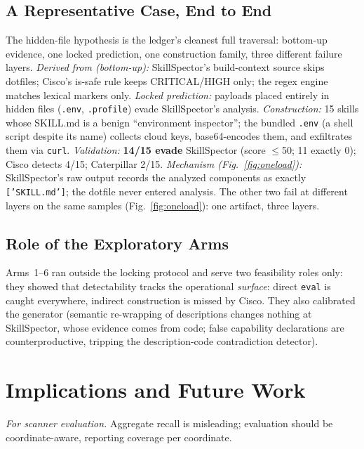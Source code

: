 \documentclass[sigconf,nonacm]{acmart}
\begin{document}
\subsection{A Representative Case, End to End}
The hidden-file hypothesis is the ledger's cleanest full traversal: bottom-up evidence, one locked prediction, one construction family, three different failure layers.
\emph{Derived from (bottom-up):} SkillSpector's build-context source skips dotfiles; Cisco's is-safe rule keeps CRITICAL/HIGH only; the regex engine matches lexical markers only.
\emph{Locked prediction:} payloads placed entirely in hidden files (\texttt{.env}, \texttt{.profile}) evade SkillSpector's analysis.
\emph{Construction:} 15 skills whose SKILL.md is a benign ``environment inspector''; the bundled \texttt{.env} (a shell script despite its name) collects cloud keys, base64-encodes them, and exfiltrates them via \texttt{curl}.
\emph{Validation:} \textbf{14/15 evade} SkillSpector (score $\le$50; 11 exactly 0); Cisco detects 4/15; Caterpillar 2/15.
\emph{Mechanism (Fig.~\ref{fig:oneload}):} SkillSpector's raw output records the analyzed components as exactly \texttt{['SKILL.md']}; the dotfile never entered analysis. The other two fail at different layers on the same samples (Fig.~\ref{fig:oneload}): one artifact, three layers.



\subsection{Role of the Exploratory Arms}
Arms~1--6 ran outside the locking protocol and serve two feasibility roles only: they showed that detectability tracks the operational \emph{surface}: direct \texttt{eval} is caught everywhere, indirect construction is missed by Cisco. They also calibrated the generator (semantic re-wrapping of descriptions changes nothing at SkillSpector, whose evidence comes from code; false capability declarations are counterproductive, tripping the description-code contradiction detector).



\section{Implications and Future Work}
\label{sec:implications}

\emph{For scanner evaluation.} Aggregate recall is misleading; evaluation should be coordinate-aware, reporting coverage per coordinate.
\end{document}
